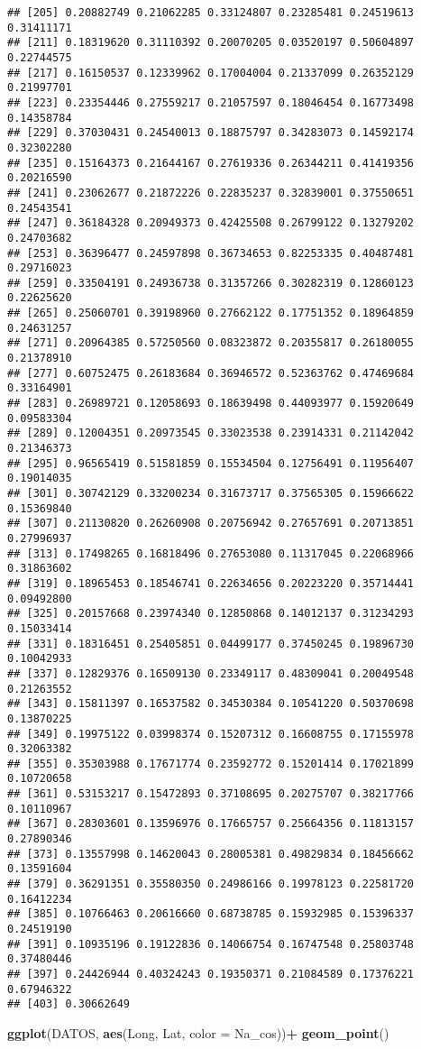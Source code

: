 \documentclass[
]{article}
\newenvironment{Shaded}{\begin{snugshade}}{\end{snugshade}}
\newcommand{\DataTypeTok}[1]{\textcolor[rgb]{0.13,0.29,0.53}{#1}}
\newcommand{\KeywordTok}[1]{\textcolor[rgb]{0.13,0.29,0.53}{\textbf{#1}}}
\newcommand{\NormalTok}[1]{#1}
\newcommand{\OperatorTok}[1]{\textcolor[rgb]{0.81,0.36,0.00}{\textbf{#1}}}
\newcommand{\StringTok}[1]{\textcolor[rgb]{0.31,0.60,0.02}{#1}}
\begin{document}
\begin{verbatim}
## [205] 0.20882749 0.21062285 0.33124807 0.23285481 0.24519613 0.31411171
## [211] 0.18319620 0.31110392 0.20070205 0.03520197 0.50604897 0.22744575
## [217] 0.16150537 0.12339962 0.17004004 0.21337099 0.26352129 0.21997701
## [223] 0.23354446 0.27559217 0.21057597 0.18046454 0.16773498 0.14358784
## [229] 0.37030431 0.24540013 0.18875797 0.34283073 0.14592174 0.32302280
## [235] 0.15164373 0.21644167 0.27619336 0.26344211 0.41419356 0.20216590
## [241] 0.23062677 0.21872226 0.22835237 0.32839001 0.37550651 0.24543541
## [247] 0.36184328 0.20949373 0.42425508 0.26799122 0.13279202 0.24703682
## [253] 0.36396477 0.24597898 0.36734653 0.82253335 0.40487481 0.29716023
## [259] 0.33504191 0.24936738 0.31357266 0.30282319 0.12860123 0.22625620
## [265] 0.25060701 0.39198960 0.27662122 0.17751352 0.18964859 0.24631257
## [271] 0.20964385 0.57250560 0.08323872 0.20355817 0.26180055 0.21378910
## [277] 0.60752475 0.26183684 0.36946572 0.52363762 0.47469684 0.33164901
## [283] 0.26989721 0.12058693 0.18639498 0.44093977 0.15920649 0.09583304
## [289] 0.12004351 0.20973545 0.33023538 0.23914331 0.21142042 0.21346373
## [295] 0.96565419 0.51581859 0.15534504 0.12756491 0.11956407 0.19014035
## [301] 0.30742129 0.33200234 0.31673717 0.37565305 0.15966622 0.15369840
## [307] 0.21130820 0.26260908 0.20756942 0.27657691 0.20713851 0.27996937
## [313] 0.17498265 0.16818496 0.27653080 0.11317045 0.22068966 0.31863602
## [319] 0.18965453 0.18546741 0.22634656 0.20223220 0.35714441 0.09492800
## [325] 0.20157668 0.23974340 0.12850868 0.14012137 0.31234293 0.15033414
## [331] 0.18316451 0.25405851 0.04499177 0.37450245 0.19896730 0.10042933
## [337] 0.12829376 0.16509130 0.23349117 0.48309041 0.20049548 0.21263552
## [343] 0.15811397 0.16537582 0.34530384 0.10541220 0.50370698 0.13870225
## [349] 0.19975122 0.03998374 0.15207312 0.16608755 0.17155978 0.32063382
## [355] 0.35303988 0.17671774 0.23592772 0.15201414 0.17021899 0.10720658
## [361] 0.53153217 0.15472893 0.37108695 0.20275707 0.38217766 0.10110967
## [367] 0.28303601 0.13596976 0.17665757 0.25664356 0.11813157 0.27890346
## [373] 0.13557998 0.14620043 0.28005381 0.49829834 0.18456662 0.13591604
## [379] 0.36291351 0.35580350 0.24986166 0.19978123 0.22581720 0.16412234
## [385] 0.10766463 0.20616660 0.68738785 0.15932985 0.15396337 0.24519190
## [391] 0.10935196 0.19122836 0.14066754 0.16747548 0.25803748 0.37480446
## [397] 0.24426944 0.40324243 0.19350371 0.21084589 0.17376221 0.67946322
## [403] 0.30662649
\end{verbatim}

\begin{Shaded}
\begin{Highlighting}[]
\KeywordTok{ggplot}\NormalTok{(DATOS, }\KeywordTok{aes}\NormalTok{(Long, Lat, }\DataTypeTok{color =}\NormalTok{ Na_cos))}\OperatorTok{+}
\StringTok{  }\KeywordTok{geom_point}\NormalTok{()}
\end{Highlighting}
\end{Shaded}
\end{document}
